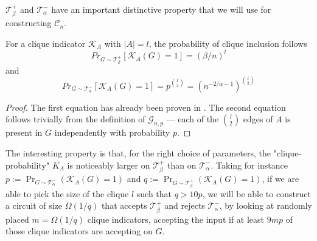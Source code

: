 
$\mathcal{T}^+_\beta$ and $\mathcal{T}^-_\alpha$ have an important distinctive property that we will use for constructing $\mathcal{C}_n$.
\begin{lemma}
\label{lem:positive-and-negative-prob}
    For a clique indicator $\mathcal{K}_A$ with $|A| = l$, the probability of clique inclusion follows
    $$Pr_{G \sim \mathcal{T}^+_\beta}[\mathcal{K}_A(G) = 1] = (\beta/n)^l$$
    and 
    $$Pr_{G \sim \mathcal{T}^-_\alpha}[\mathcal{K}_A(G) = 1] = p^{\binom{l}{2}} = (n^{-2/\alpha - 1})^{\binom{l}{2}}$$
\end{lemma}
\begin{proof}
The first equation has already been proven in . The second equation follows trivially from the definition of $\mathcal{G}_{n, p}$ --- each of the $\binom{l}{2}$ edges of $A$ is present in $G$ independently with probability $p$.
\end{proof}

The interesting property is that, for the right choice of parameters, the "clique-probability" $K_A$ is noticeably larger on $\mathcal{T}^+_\beta$ than on $\mathcal{T}^-_\alpha$. Taking for instance $p := \Pr_{G\sim\mathcal{T}_\alpha^-}(\mathcal{K}_A(G) = 1)$ and $q :=\Pr_{G\sim\mathcal{T}_\beta^+}(\mathcal{K}_A(G) = 1)$, if we are able to pick the size of the clique $l$ such that $q > 10p$, we will be able to construct a circuit of size $\Omega(1/q)$ that accepts $\mathcal{T}^+_\beta$ and rejects $\mathcal{T}^-_\alpha$, by looking at randomly placed $m = \Omega(1/q)$ clique indicators, accepting the input if at least $9 m p $ of those clique indicators are accepting on $G$.


